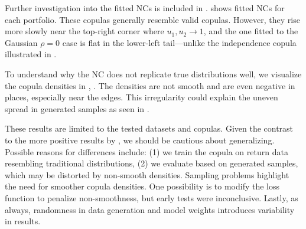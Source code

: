 Further investigation into the fitted \gls{NC}s is included in .  shows fitted \gls{NC}s for each portfolio. These copulas generally resemble valid copulas. However, they rise more slowly near the top-right corner where $u_1, u_2 \rightarrow 1$, and the one fitted to the Gaussian $\rho=0$ case is flat in the lower-left tail—unlike the independence copula illustrated in .

To understand why the \gls{NC} does not replicate true distributions well, we visualize the copula densities in , . The densities are not smooth and are even negative in places, especially near the edges. This irregularity could explain the uneven spread in generated samples as seen in .

These results are limited to the tested datasets and copulas. Given the contrast to the more positive results by \citet[pp.~17-18]{ZengWang2022}, we should be cautious about generalizing. Possible reasons for differences include: (1) we train the copula on return data resembling traditional distributions, (2) we evaluate based on generated samples, which may be distorted by non-smooth densities. Sampling problems highlight the need for smoother copula densities. One possibility is to modify the loss function to penalize non-smoothness, but early tests were inconclusive. Lastly, as always, randomness in data generation and model weights introduces variability in results.














